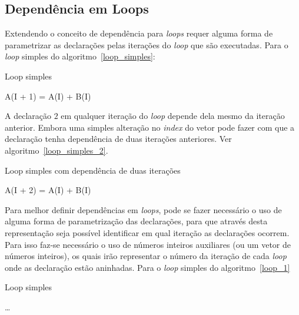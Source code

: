 \subsection{Dependência em Loops}

Extendendo o conceito de dependência para \textit{loops} requer alguma forma de
parametrizar as declarações pelas iterações do \textit{loop} que são
executadas.
Para o \textit{loop} simples do algoritmo~\ref{loop_simples}:

\begin{algorithm}
        \caption{Loop simples}
        \label{loop_simples}
        \begin{algorithmic}[1]
                \STATE A(I + 1) = A(I) + B(I) 
        \ENDFOR
        \end{algorithmic}
\end{algorithm}

A declaração $2$ em qualquer iteração do \textit{loop} depende dela mesmo da
iteração anterior. Embora uma simples alteração no \textit{index} do vetor pode
fazer com que a declaração tenha dependência de duas iterações anteriores.
Ver algoritmo~\ref{loop_simples_2}.

\begin{algorithm}
        \caption{Loop simples com dependência de duas iterações}
        \label{loop_simples_2}
        \begin{algorithmic}[1]
                \STATE A(I + 2) = A(I) + B(I) 
        \ENDFOR
        \end{algorithmic}
\end{algorithm}

Para melhor definir dependências em \textit{loops},  pode se fazer necessário o
uso de alguma forma de parametrização das declarações, para que através desta
representação seja possível identificar em qual iteração as declarações ocorrem.
Para isso faz-se necessário o uso de números inteiros auxiliares (ou um vetor de
números inteiros), os quais irão representar o número da iteração de cada 
\textit{loop} onde as declaração estão aninhadas.
Para o \textit{loop} simples do algoritmo~\ref{loop_1}

\begin{algorithm}
        \caption{Loop simples}
        \label{loop_1}
        \begin{algorithmic}[1]
                \STATE \ldots
                \ENDFOR
        \end{algorithmic}
\end{algorithm}

